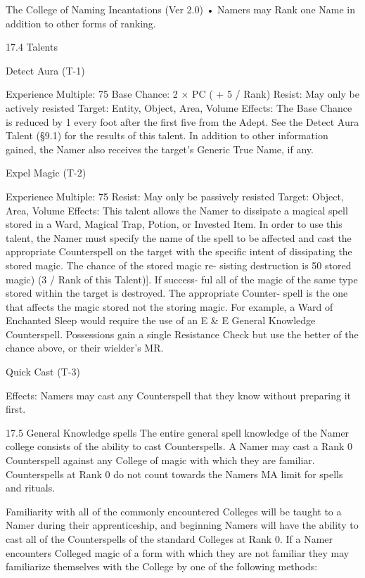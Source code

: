\begin{Chapter}{The College of Naming Incantations (Ver 2.0)}
• Namers may Rank one Name in addition to other 
forms of ranking. 

17.4 Talents  

Detect Aura (T-1) 

Experience Multiple: 75 
Base Chance: 2 × PC ( + 5 / Rank) 
Resist: May only be actively resisted 
Target: Entity, Object, Area, Volume 
Effects:  The  Base  Chance  is  reduced  by  1%
every  foot  after  the  first  five  from  the  Adept.  See 
the Detect Aura Talent (§9.1) for the results of this 
talent.  In  addition  to  other  information  gained,  the 
Namer  also  receives  the  target’s  Generic  True 
Name, if any. 

Expel Magic (T-2) 

Experience Multiple: 75 
Resist: May only be passively resisted 
Target: Object, Area, Volume 
Effects: This talent allows the Namer to dissipate a 
magical  spell  stored  in  a  Ward,  Magical  Trap, 
Potion, or Invested Item. In order to use this talent, 
the Namer must specify the name of the spell to be 
affected  and  cast  the  appropriate  Counterspell  on 
the target with the specific intent of dissipating the 
stored  magic.  The  chance  of  the  stored  magic  re-
sisting  destruction  is  50%
stored magic) (3 / Rank of this Talent)]. If success-
ful all of the magic of the same type stored within 
the  target  is  destroyed.  The  appropriate  Counter-
spell is the one that affects the magic stored not the 
storing  magic.  For  example,  a  Ward  of  Enchanted 
Sleep  would  require  the  use  of  an  E  \&  E  General 
Knowledge Counterspell. Possessions gain a single 
Resistance  Check  but  use  the  better  of  the  chance 
above, or their wielder’s MR. 

Quick Cast (T-3) 

Effects:  Namers  may  cast  any  Counterspell  that 
they know without preparing it first. 

17.5 General Knowledge spells 
The  entire  general  spell  knowledge  of  the  Namer 
college consists of the ability to cast Counterspells. 
A  Namer  may  cast  a  Rank  0  Counterspell  against 
any College of magic with which they are familiar. 
Counterspells  at  Rank  0  do  not  count  towards  the 
Namers MA limit for spells and rituals. 

Familiarity  with  all  of  the  commonly  encountered 
Colleges  will  be  taught  to  a  Namer  during  their 
apprenticeship,  and  beginning  Namers  will  have 
the  ability  to  cast  all  of  the  Counterspells  of  the 
standard Colleges at Rank 0. If a Namer encounters 
Colleged magic of a form with which they are not 
familiar  they  may  familiarize  themselves  with  the 
College by one of the following methods:  


\end{Chapter}
